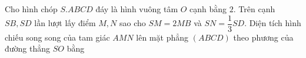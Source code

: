 \begin{ex}
Cho hình chóp $S.ABCD$ đáy là hình vuông tâm $O$ cạnh bằng $2$. Trên cạnh $SB,SD$ lần lượt lấy điểm $M,N$ sao cho $SM=2MB$ và $SN=\dfrac13SD$. Diện tích hình chiếu song song của tam giác $AMN$ lên mặt phẳng $(ABCD)$ theo phương của đường thẳng $SO$ bằng
\end{ex}
